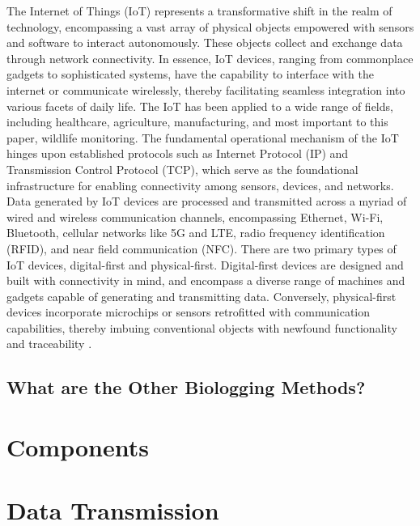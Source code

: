 \documentclass[sigplan,screen,nonacm]{acmart}
\begin{document}
The Internet of Things (IoT) represents a transformative shift in the 
realm of technology, encompassing a vast array of physical objects empowered 
with sensors and software to interact autonomously. These objects collect and 
exchange data through network connectivity. In essence, IoT devices, ranging 
from commonplace gadgets to sophisticated systems, have the capability to 
interface with the internet or communicate wirelessly, thereby facilitating 
seamless integration into various facets of daily life. The IoT has been 
applied to a wide range of fields, including healthcare, agriculture, 
manufacturing, and most important to this paper, wildlife monitoring. The 
fundamental operational mechanism of the IoT hinges upon established protocols 
such as Internet Protocol (IP) and Transmission Control Protocol (TCP), which 
serve as the foundational infrastructure for enabling connectivity among 
sensors, devices, and networks. Data generated by IoT devices are processed 
and transmitted across a myriad of wired and wireless communication channels, 
encompassing Ethernet, Wi-Fi, Bluetooth, cellular networks like 5G and LTE, 
radio frequency identification (RFID), and near field communication (NFC)\cite{greengard2021internet}.
There are two primary types of IoT devices, digital-first and physical-first. 
Digital-first devices are designed and built with connectivity in mind, and 
encompass a diverse range of machines and gadgets capable of generating and 
transmitting data. Conversely, physical-first devices incorporate microchips 
or sensors retrofitted with communication capabilities, thereby imbuing 
conventional objects with newfound functionality and traceability \cite{greengard2021internet}.

\subsection{What are the Other Biologging Methods?}
\label{subsec:What are the Other Biologging Methods?}

\section{Components}
\label{sec:Components}

\section{Data Transmission}
\label{sec:Data Transmission}
\end{document}
